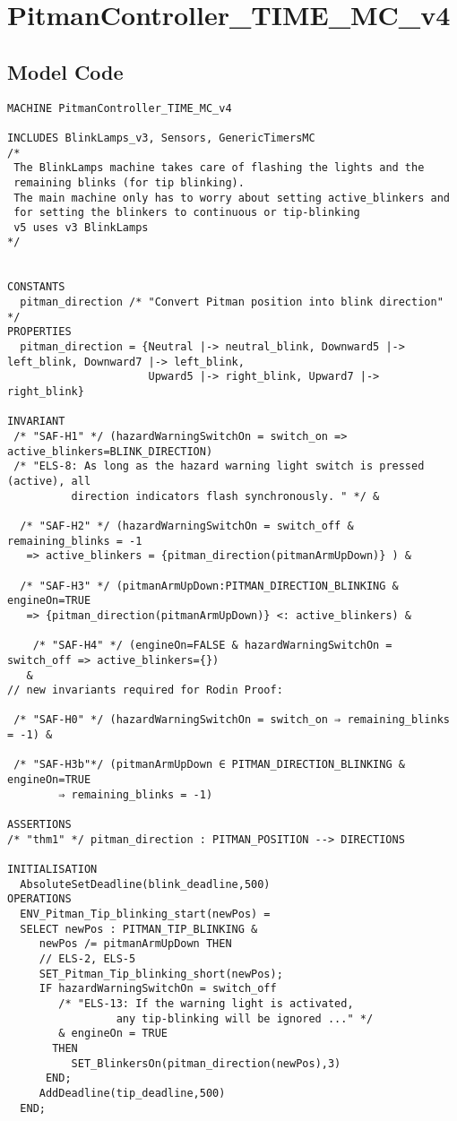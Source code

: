 \documentclass[11pt]{article}
\begin{document}
\section{PitmanController\_TIME\_MC\_v4}
\subsection{Model Code}
\begin{lstlisting}[caption = PitmanController\_TIME\_MC\_v4 MCH Code]
	MACHINE PitmanController_TIME_MC_v4

INCLUDES BlinkLamps_v3, Sensors, GenericTimersMC
/*
 The BlinkLamps machine takes care of flashing the lights and the
 remaining blinks (for tip blinking).
 The main machine only has to worry about setting active_blinkers and
 for setting the blinkers to continuous or tip-blinking
 v5 uses v3 BlinkLamps
*/


CONSTANTS
  pitman_direction /* "Convert Pitman position into blink direction" */
PROPERTIES
  pitman_direction = {Neutral |-> neutral_blink, Downward5 |-> left_blink, Downward7 |-> left_blink,
                      Upward5 |-> right_blink, Upward7 |-> right_blink}

INVARIANT
 /* "SAF-H1" */ (hazardWarningSwitchOn = switch_on => active_blinkers=BLINK_DIRECTION)
 /* "ELS-8: As long as the hazard warning light switch is pressed (active), all
          direction indicators flash synchronously. " */ &
 
  /* "SAF-H2" */ (hazardWarningSwitchOn = switch_off & remaining_blinks = -1
   => active_blinkers = {pitman_direction(pitmanArmUpDown)} ) &

  /* "SAF-H3" */ (pitmanArmUpDown:PITMAN_DIRECTION_BLINKING & engineOn=TRUE
   => {pitman_direction(pitmanArmUpDown)} <: active_blinkers) &
   
    /* "SAF-H4" */ (engineOn=FALSE & hazardWarningSwitchOn = switch_off => active_blinkers={})
   &
// new invariants required for Rodin Proof:

 /* "SAF-H0" */ (hazardWarningSwitchOn = switch_on ⇒ remaining_blinks = -1) &
 
 /* "SAF-H3b"*/ (pitmanArmUpDown ∈ PITMAN_DIRECTION_BLINKING & engineOn=TRUE
        ⇒ remaining_blinks = -1)

ASSERTIONS
/* "thm1" */ pitman_direction : PITMAN_POSITION --> DIRECTIONS

INITIALISATION
  AbsoluteSetDeadline(blink_deadline,500)
OPERATIONS
  ENV_Pitman_Tip_blinking_start(newPos) = 
  SELECT newPos : PITMAN_TIP_BLINKING &
     newPos /= pitmanArmUpDown THEN
     // ELS-2, ELS-5
     SET_Pitman_Tip_blinking_short(newPos);
     IF hazardWarningSwitchOn = switch_off
        /* "ELS-13: If the warning light is activated,
                 any tip-blinking will be ignored ..." */
        & engineOn = TRUE
       THEN
          SET_BlinkersOn(pitman_direction(newPos),3)
      END;
     AddDeadline(tip_deadline,500)
  END;
  


\end{lstlisting}
\end{document}
